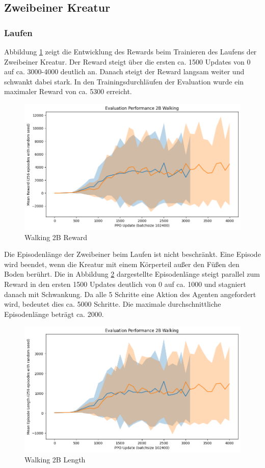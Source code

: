 \subsection{Zweibeiner Kreatur}

\subsubsection{Laufen}
Abbildung \ref{fig:Walking2B_Reward} zeigt die Entwicklung des Rewards beim Trainieren des Laufens der Zweibeiner Kreatur. Der Reward steigt über die ersten ca. 1500 Updates von 0 auf ca. 3000-4000 deutlich an. Danach steigt der Reward langsam weiter und schwankt dabei stark. In den Trainingsdurchläufen der Evaluation wurde ein maximaler Reward von ca. 5300 erreicht.

\begin{figure}[ht]
    \centering
    \includegraphics[width=0.5\linewidth]{resources/img/results/Walking2B_Reward.png}
    \caption{Walking 2B Reward}\label{fig:Walking2B_Reward}
\end{figure}

Die Episodenlänge der Zweibeiner beim Laufen ist nicht beschränkt. Eine Episode wird beendet, wenn die Kreatur mit einem Körperteil außer den Füßen den Boden berührt. Die in Abbildung \ref{fig:Walking2B_Length} dargestellte Episodenlänge steigt parallel zum Reward in den ersten 1500 Updates deutlich von 0 auf ca. 1000 und stagniert danach mit Schwankung. Da alle 5 Schritte eine Aktion des Agenten angefordert wird, bedeutet dies ca. 5000 Schritte. Die maximale durchschnittliche Episodenlänge beträgt ca. 2000.

\begin{figure}[ht]
    \centering
    \includegraphics[width=0.5\linewidth]{resources/img/results/Walking2B_Length.png}
    \caption{Walking 2B Length}\label{fig:Walking2B_Length}
\end{figure}

